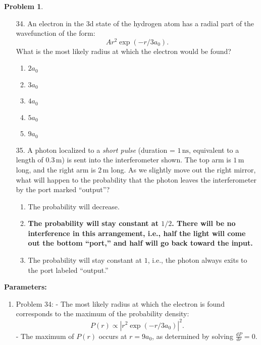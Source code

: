 \documentclass[12pt]{article}
\theoremstyle{definition} %
\newtheorem{problem}{Problem}
\theoremstyle{plain} %
\begin{document}
\begin{problem}
    \begin{enumerate}
        \item[34.] An electron in the 3d state of the hydrogen atom has a radial part of the wavefunction of the form:
        $$
        A r^2 \exp(-r/3a_0).
        $$
        What is the most likely radius at which the electron would be found?
        \begin{enumerate}
            \item \(2a_0\)
            \item \(3a_0\)
            \item \(4a_0\)
            \item \(5a_0\)
            \item \textbf{\(9a_0\)}
        \end{enumerate}
    
        \item[35.] A photon localized to a \textit{short pulse} (duration = \(1 \, \text{ns}\), equivalent to a length of \(0.3 \, \text{m}\)) is sent into the interferometer shown. The top arm is \(1 \, \text{m}\) long, and the right arm is \(2 \, \text{m}\) long. As we slightly move out the right mirror, what will happen to the probability that the photon leaves the interferometer by the port marked “output”?
        \begin{enumerate}
            \item The probability will decrease.
            \item \textbf{The probability will stay constant at \(1/2\). There will be no interference in this arrangement, i.e., half the light will come out the bottom “port,” and half will go back toward the input.}
            \item The probability will stay constant at \(1\), i.e., the photon always exits to the port labeled “output.”
        \end{enumerate}
    \end{enumerate}
    
    \textbf{Parameters:}
    \begin{enumerate}
        \item Problem 34:
        - The most likely radius at which the electron is found corresponds to the maximum of the probability density:
        $$
        P(r) \propto \left| r^2 \exp(-r/3a_0) \right|^2.
        $$
        - The maximum of \(P(r)\) occurs at \(r = 9a_0\), as determined by solving \(\frac{dP}{dr} = 0\).
    

\end{enumerate}
\end{problem}
\end{document}
